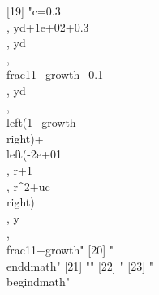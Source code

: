  [19] "{c}=0.3\\, {yd}+1e+02+0.3\\, {yd}\\, \\frac{1}{1+{growth}}+0.1\\, {yd}\\, \\left(1+{growth}\\right)+\\left(-2e+01\\, {r}+1\\, {r}^{2}+{uc}\\right)\\, {y}\\, \\frac{1}{1+{growth}}"                                                                                                                                                                                                                                                                                                          
 [20] "\\end{dmath}"                                                                                                                                                                                                                                                                                                                                                                                                                                                                                
 [21] ""                                                                                                                                                                                                                                                                                                                                                                                                                                                                                            
 [22] "%
 [23] "\\begin{dmath}"                                                                                                                                                                                                                                                                                                                                                                                                                                                                              
